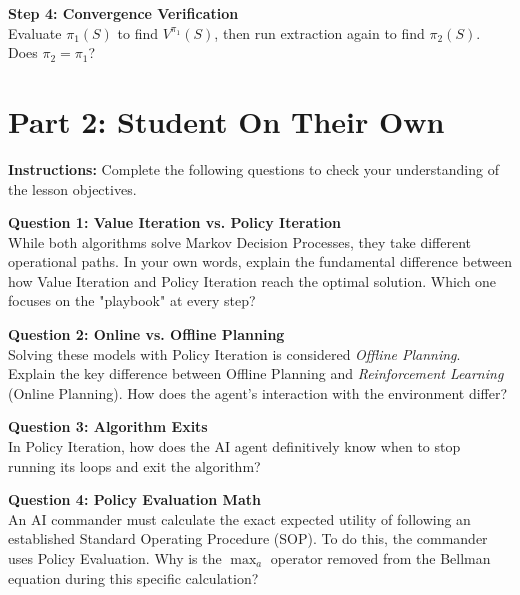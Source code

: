 \documentclass[12pt]{article}
\begin{document}
\noindent \textbf{Step 4: Convergence Verification}\\
Evaluate $\pi_1(S)$ to find $V^{\pi_1}(S)$, then run extraction again to find $\pi_2(S)$. \\
Does $\pi_2 = \pi_1$?
\vspace{4cm}

\newpage
\section*{Part 2: Student On Their Own}
\textbf{Instructions:} Complete the following questions to check your understanding of the lesson objectives.

\vspace{0.5cm}
\noindent \textbf{Question 1: Value Iteration vs. Policy Iteration} \\
While both algorithms solve Markov Decision Processes, they take different operational paths. In your own words, explain the fundamental difference between how Value Iteration and Policy Iteration reach the optimal solution. Which one focuses on the "playbook" at every step?
\vspace{4cm}

\noindent \textbf{Question 2: Online vs. Offline Planning} \\
Solving these models with Policy Iteration is considered \textit{Offline Planning}. Explain the key difference between Offline Planning and \textit{Reinforcement Learning} (Online Planning). How does the agent's interaction with the environment differ?
\vspace{4cm}

\noindent \textbf{Question 3: Algorithm Exits} \\
In Policy Iteration, how does the AI agent definitively know when to stop running its loops and exit the algorithm?
\vspace{4cm}

\noindent \textbf{Question 4: Policy Evaluation Math} \\
An AI commander must calculate the exact expected utility of following an established Standard Operating Procedure (SOP). To do this, the commander uses Policy Evaluation. Why is the $\max_a$ operator removed from the Bellman equation during this specific calculation?
\vspace{4cm}
\end{document}
